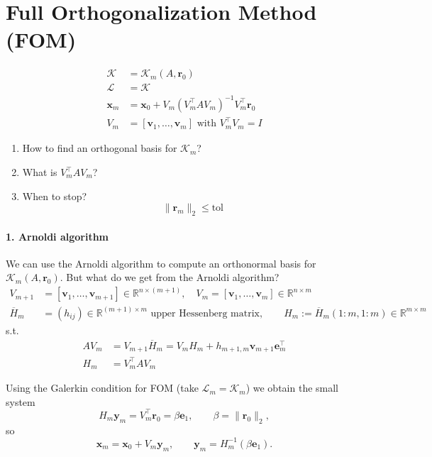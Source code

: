 \section{Full Orthogonalization Method (FOM)}
\begin{align*}
    \mathcal{K}  & = \mathcal{K}_m(A, \mathbf{r}_0)                                            \\
    \mathcal{L}  & = \mathcal{K}                                                               \\
    \mathbf{x}_m & = \mathbf{x}_0 + V_m \left(V_m^\top A V_m\right)^{-1} V_m^\top \mathbf{r}_0 \\
    V_m          & = [\mathbf{v}_1, \ldots, \mathbf{v}_m] \text{ with } V_m^\top V_m = I
\end{align*}

\begin{enumerate}
    \item How to find an orthogonal basis for $\mathcal{K}_m$?
    \item What is $V_m^\top A V_m$?
    \item When to stop?
          \[ \|\mathbf{r}_m\|_2 \leq \text{tol} \]
\end{enumerate}
\paragraph{1. Arnoldi algorithm}
We can use the Arnoldi algorithm to compute an orthonormal basis for $\mathcal{K}_m(A, \mathbf{r}_0)$.
But what do we get from the Arnoldi algorithm?
\begin{align*}
    V_{m+1}        & = [\mathbf{v}_1, \ldots, \mathbf{v}_{m+1}] \in \mathbb{R}^{n \times (m+1)}, \quad V_m = [\mathbf{v}_1, \ldots, \mathbf{v}_m] \in \mathbb{R}^{n \times m} \\
    \overline{H}_m & = (h_{ij}) \in \mathbb{R}^{(m+1) \times m} \text{ upper Hessenberg matrix}, \qquad H_m := \overline{H}_m(1:m,1:m) \in \mathbb{R}^{m\times m}
\end{align*}
s.t.
\begin{align*}
    A V_m &= V_{m+1} \overline{H}_m = V_m H_m + h_{m+1,m} \mathbf{v}_{m+1}\mathbf{e}_m^\top\\
    H_m   &= V_m^\top A V_m
\end{align*}

Using the Galerkin condition for FOM (take $\mathcal{L}_m =\mathcal{K}_m$) we obtain the small system
\[
    H_m \mathbf{y}_m = V_m^\top \mathbf{r}_0 = \beta \mathbf{e}_1, \qquad \beta=\|\mathbf{r}_0\|_2,
\]
so
\[
    \mathbf{x}_m = \mathbf{x}_0 + V_m \mathbf{y}_m, \qquad \mathbf{y}_m = H_m^{-1} (\beta \mathbf{e}_1).
\]

